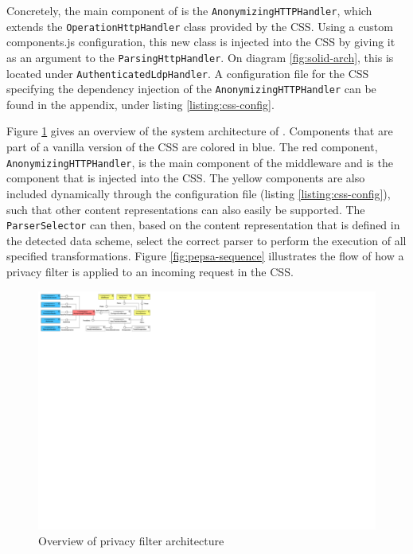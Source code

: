 Concretely, the main component of \middleware{} is the \texttt{AnonymizingHTTPHandler}, which extends the \texttt{OperationHttpHandler} class provided by the \gls{CSS}. Using a custom components.js configuration, this new class is injected into the \gls{CSS} by giving it as an argument to the \texttt{ParsingHttpHandler}. On diagram \ref{fig:solid-arch}, this is located under \texttt{AuthenticatedLdpHandler}. A configuration file for the \gls{CSS} specifying the dependency injection of the \texttt{AnonymizingHTTPHandler} can be found in the appendix, under listing \ref{listing:css-config}.

Figure \ref{fig:arch-overview} gives an overview of the system architecture of \middleware{}. Components that are part of a vanilla version of the \gls{CSS} are colored in blue. The red component, \texttt{AnonymizingHTTPHandler}, is the main component of the middleware and is the component that is injected into the \gls{CSS}. The yellow components are also included dynamically through the configuration file (listing \ref{listing:css-config}), such that other content representations can also easily be supported. The \texttt{ParserSelector} can then, based on the content representation that is defined in the detected data scheme, select the correct parser to perform the execution of all specified transformations. 
Figure \ref{fig:pepsa-sequence} illustrates the flow of how a privacy filter is applied to an incoming request in the \gls{CSS}.

\begin{figure}
    \centering
    \includegraphics[width=1.0\textwidth]{images/architecture/PePSA-System-Overview.pdf}
    \caption{Overview of \middleware{} privacy filter architecture}
    \label{fig:arch-overview}
\end{figure}



